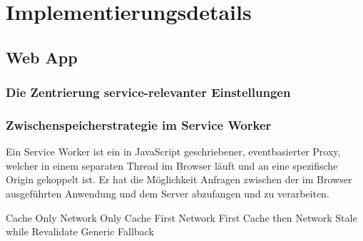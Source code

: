 \chapter{Implementierungsdetails}


\section{Web App}
\subsection{Die Zentrierung service-relevanter Einstellungen}

\subsection{Zwischenspeicherstrategie im Service Worker}
Ein Service Worker ist ein in JavaScript geschriebener,
eventbasierter Proxy, welcher in einem separaten Thread im Browser
läuft und an eine spezifische Origin gekoppelt ist. Er hat
die Möglichkeit Anfragen zwischen der im Browser ausgeführten
Anwendung und dem Server abzufangen und zu verarbeiten.

Cache Only
Network Only
Cache First
Network First
Cache then Network
Stale while Revalidate
Generic Fallback

